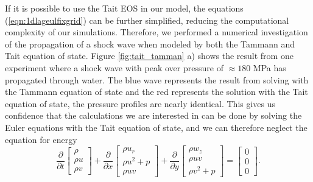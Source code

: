 \documentclass{article}
\begin{document}
If it is possible to use the Tait EOS in our model, the equations (\ref{eqn:1dlageulfixgrid}) can be further 
simplified, reducing the computational complexity of our simulations.  Therefore, we performed a 
numerical investigation of the propagation of a shock wave when modeled by both the Tammann and 
Tait equation of state.  Figure \ref{fig:tait_tamman} a) shows the result from one experiment where a 
shock wave with peak over pressure of $\approx 180$ MPa has propagated through water.  The blue 
wave represents the result from solving with the Tammann equation of state and the red represents the 
solution with the Tait equation of state, the pressure profiles are nearly identical.  This gives us 
confidence that the calculations we are interested in can be done by solving the Euler equations with the 
Tait equation of state, and we can therefore neglect the equation for energy
\begin{equation}
	\frac{\partial}{\partial t} \left[ \begin{array}{c} \rho \\ \rho u \\ \rho v \end{array} \right] +
	\frac{\partial}{\partial x} \left[ \begin{array}{c} \rho u_r \\ \rho u^2 + p \\ \rho u v \end{array} \right] + 
	\frac{\partial}{\partial y} \left[ \begin{array}{c} \rho w_z \\ \rho u v\\ \rho v^2 + p \end{array} \right ] = 
	\left[ \begin{array}{c} 0 \\ 0 \\0  \end{array}\right ]. 
	\label{eqn:isentropic}
\end{equation}
\end{document}
